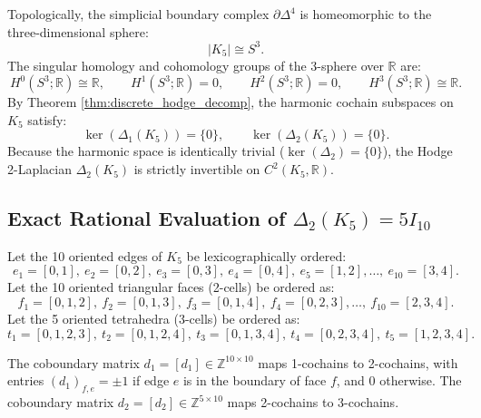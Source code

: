 Topologically, the simplicial boundary complex $\partial \Delta^4$ is homeomorphic to the three-dimensional sphere:
\begin{equation}
\label{eq:k5_s3_homeomorphism}
|K_5| \cong S^3.
\end{equation}
The singular homology and cohomology groups of the 3-sphere over $\mathbb{R}$ are:
\begin{equation}
\label{eq:s3_cohomology}
H^0(S^3; \mathbb{R}) \cong \mathbb{R}, \qquad H^1(S^3; \mathbb{R}) = 0, \qquad H^2(S^3; \mathbb{R}) = 0, \qquad H^3(S^3; \mathbb{R}) \cong \mathbb{R}.
\end{equation}
By Theorem \ref{thm:discrete_hodge_decomp}, the harmonic cochain subspaces on $K_5$ satisfy:
\begin{equation}
\ker(\Delta_1(K_5)) = \{0\}, \qquad \ker(\Delta_2(K_5)) = \{0\}.
\end{equation}
Because the harmonic space is identically trivial ($\ker(\Delta_2) = \{0\}$), the Hodge 2-Laplacian $\Delta_2(K_5)$ is strictly invertible on $C^2(K_5, \mathbb{R})$.

\subsection{Exact Rational Evaluation of $\Delta_2(K_5) = 5 I_{10}$}
\label{subsec:k5_exact_proof}

Let the 10 oriented edges of $K_5$ be lexicographically ordered:
\begin{equation}
e_1 = [0,1], \ e_2 = [0,2], \ e_3 = [0,3], \ e_4 = [0,4], \ e_5 = [1,2], \dots, \ e_{10} = [3,4].
\end{equation}
Let the 10 oriented triangular faces (2-cells) be ordered as:
\begin{equation}
f_1 = [0,1,2], \ f_2 = [0,1,3], \ f_3 = [0,1,4], \ f_4 = [0,2,3], \dots, \ f_{10} = [2,3,4].
\end{equation}
Let the 5 oriented tetrahedra (3-cells) be ordered as:
\begin{equation}
t_1 = [0,1,2,3], \ t_2 = [0,1,2,4], \ t_3 = [0,1,3,4], \ t_4 = [0,2,3,4], \ t_5 = [1,2,3,4].
\end{equation}

The coboundary matrix $d_1 = [d_1] \in \mathbb{Z}^{10 \times 10}$ maps 1-cochains to 2-cochains, with entries $(d_1)_{f, e} = \pm 1$ if edge $e$ is in the boundary of face $f$, and $0$ otherwise. The coboundary matrix $d_2 = [d_2] \in \mathbb{Z}^{5 \times 10}$ maps 2-cochains to 3-cochains.

